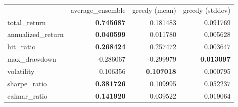 \begin{tabular}{lrrr}
 & average_ensemble & greedy (mean) & greedy (stddev) \\
total_return & \bfseries 0.745687 & 0.181483 & 0.091769 \\
annualized_return & \bfseries 0.040599 & 0.011780 & 0.005628 \\
hit_ratio & \bfseries 0.268424 & 0.257472 & 0.003647 \\
max_drawdown & -0.286067 & -0.299979 & \bfseries 0.013097 \\
volatility & 0.106356 & \bfseries 0.107018 & 0.000795 \\
sharpe_ratio & \bfseries 0.381726 & 0.109995 & 0.052237 \\
calmar_ratio & \bfseries 0.141920 & 0.039522 & 0.019064 \\
\end{tabular}
